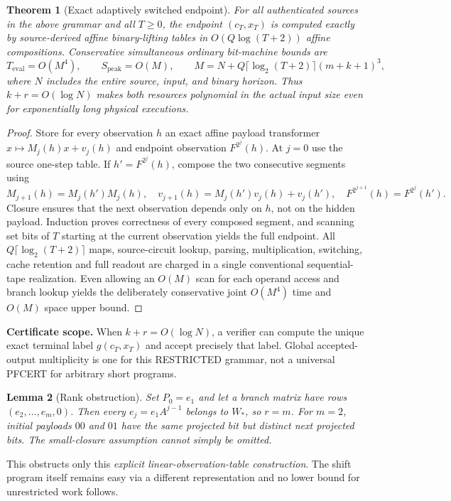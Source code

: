 \documentclass[11pt]{article}
\newtheorem{theorem}{Theorem}
\newtheorem{lemma}[theorem]{Lemma}
\begin{document}
\begin{theorem}[Exact adaptively switched endpoint]
For all authenticated sources in the above grammar and all $T\ge0$, the endpoint $(c_T,x_T)$ is computed exactly by source-derived affine binary-lifting tables in $O(Q\log(T+2))$ affine compositions. Conservative simultaneous ordinary bit-machine bounds are
\[
T_{\mathrm{eval}}=O(M^4),\qquad S_{\mathrm{peak}}=O(M),\qquad
M=N+Q\lceil\log_2(T+2)\rceil(m+k+1)^3,
\]
where $N$ includes the entire source, input, and binary horizon. Thus $k+r=O(\log N)$ makes both resources polynomial in the actual input size even for exponentially long physical executions.
\end{theorem}
\begin{proof}
Store for every observation $h$ an exact affine payload transformer $x\mapsto M_j(h)x+v_j(h)$ and endpoint observation $F^{2^j}(h)$. At $j=0$ use the source one-step table. If $h'=F^{2^j}(h)$, compose the two consecutive segments using
\[
M_{j+1}(h)=M_j(h')M_j(h),\quad
v_{j+1}(h)=M_j(h')v_j(h)+v_j(h'),\quad
F^{2^{j+1}}(h)=F^{2^j}(h').
\]
Closure ensures that the next observation depends only on $h$, not on the hidden payload. Induction proves correctness of every composed segment, and scanning set bits of $T$ starting at the current observation yields the full endpoint. All $Q\lceil\log_2(T+2)\rceil$ maps, source-circuit lookup, parsing, multiplication, switching, cache retention and full readout are charged in a single conventional sequential-tape realization. Even allowing an $O(M)$ scan for each operand access and branch lookup yields the deliberately conservative joint $O(M^4)$ time and $O(M)$ space upper bound.
\end{proof}
\noindent\textbf{Certificate scope.} When $k+r=O(\log N)$, a verifier can compute the unique exact terminal label $g(c_T,x_T)$ and accept precisely that label. Global accepted-output multiplicity is one for this RESTRICTED grammar, not a universal PFCERT for arbitrary short programs.

\begin{lemma}[Rank obstruction]
Set $P_0=e_1$ and let a branch matrix have rows $(e_2,\dots,e_m,0)$. Then every $e_j=e_1A^{j-1}$ belongs to $W_*$, so $r=m$. For $m=2$, initial payloads $00$ and $01$ have the same projected bit but distinct next projected bits. The small-closure assumption cannot simply be omitted.
\end{lemma}
This obstructs only this \emph{explicit linear-observation-table construction}. The shift program itself remains easy via a different representation and no lower bound for unrestricted work follows.
\end{document}
